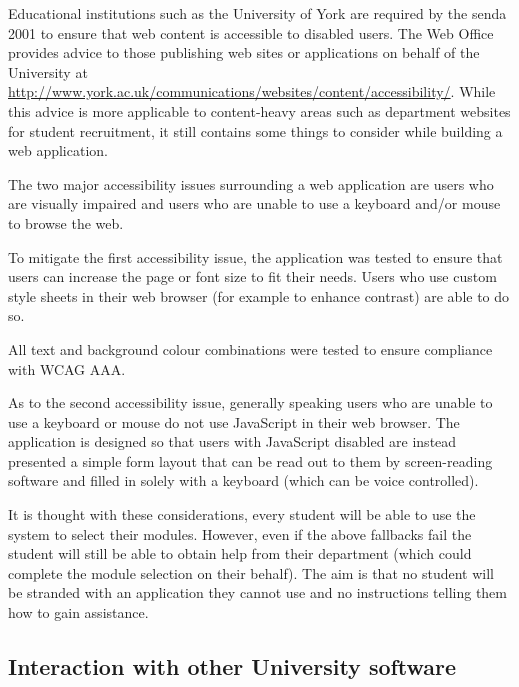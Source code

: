 \documentclass[draft]{scrartcl}
\begin{document}

Educational institutions such as the University of York are required by the
\gls{senda} 2001 to ensure that web content is accessible to disabled users.
The Web Office provides advice to those publishing web sites or applications
on behalf of the University at
\url{http://www.york.ac.uk/communications/websites/content/accessibility/}.
While this advice is more applicable to content-heavy areas such as department
websites for student recruitment, it still contains some things to consider
while building a web application.


The two major accessibility issues surrounding a web application are users who
are visually impaired and users who are unable to use a keyboard and/or mouse
to browse the web.

To mitigate the first accessibility issue, the application was tested to
ensure that users can increase the page or font size to fit their needs. Users
who use custom style sheets in their web browser (for example to enhance
contrast) are able to do so.

All text and background colour combinations were tested to ensure compliance
with WCAG AAA.


As to the second accessibility issue, generally speaking users who are unable
to use a keyboard or mouse do not use JavaScript in their web browser. The
application is designed so that users with JavaScript disabled are instead
presented a simple form layout that can be read out to them by screen-reading
software and filled in solely with a keyboard (which can be voice controlled).

It is thought with these considerations, every student will be able to use the
system to select their modules. However, even if the above fallbacks fail the
student will still be able to obtain help from their department (which could
complete the module selection on their behalf). The aim is that no student
will be stranded with an application they cannot use and no instructions
telling them how to gain assistance.


\subsection{Interaction with other University software}
\end{document}
